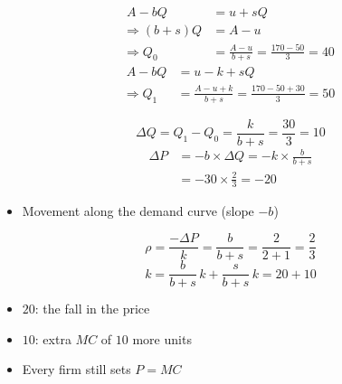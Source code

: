 \begin{frame}[plain,label=w2_18_we6b]
  \Large
  \begin{align*}
    \tag{54}\;A - bQ &= u + sQ\\
    \Rightarrow (b + s)Q &= A - u\\
    \Rightarrow Q_0 &= \frac{A - u}{b + s} = \frac{170 - 50}{3} = 40
  \end{align*}
  \begin{align*}
    \tag{55}\;A - bQ &= u - k + sQ\\
    \Rightarrow Q_1 &= \frac{A - u + k}{b + s} = \frac{170 - 50 + 30}{3} = 50
  \end{align*}
\end{frame}

\begin{frame}[plain,label=w2_19_we6c]
  \Large
  \[
    \tag{56}\;\Delta Q = Q_1 - Q_0 = \frac{k}{b + s} = \frac{30}{3} = 10
  \]
  \begin{align*}
    \tag{57}\;\Delta P &= -b \times \Delta Q = -k \times \frac{b}{b + s}\\
                      &= -30 \times \frac{2}{3} = -20
  \end{align*}

  \vspace{0.3em}
  \begin{itemize}\Large
    \item Movement along the demand curve (slope $-b$)
  \end{itemize}
\end{frame}

\begin{frame}[plain,label=w2_20_we6d]
  \Large
  \[
    \tag{58}\;\rho = \frac{-\Delta P}{k} = \frac{b}{b + s} = \frac{2}{2 + 1} = \frac{2}{3}
  \]
  \[
    \tag{59}\;k = \frac{b}{b + s}\,k + \frac{s}{b + s}\,k = 20 + 10
  \]

  \vspace{0.3em}
  \begin{itemize}\Large
    \item $20$: the fall in the price
    \item $10$: extra $MC$ of $10$ more units
    \item Every firm still sets $P = MC$
  \end{itemize}
\end{frame}

